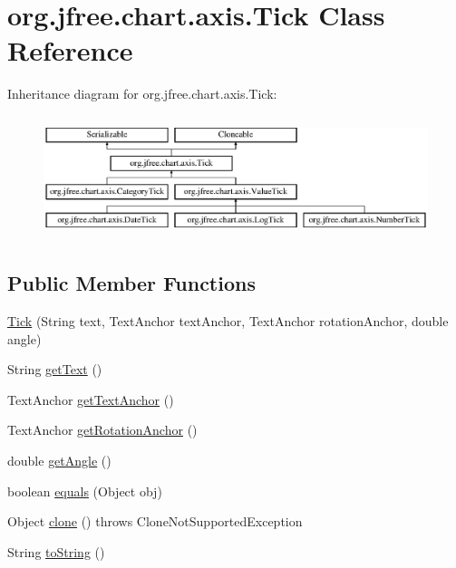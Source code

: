 \hypertarget{classorg_1_1jfree_1_1chart_1_1axis_1_1_tick}{}\section{org.\+jfree.\+chart.\+axis.\+Tick Class Reference}
\label{classorg_1_1jfree_1_1chart_1_1axis_1_1_tick}
Inheritance diagram for org.\+jfree.\+chart.\+axis.\+Tick\+:\begin{figure}[H]
\begin{center}
\leavevmode
\includegraphics[height=3.607085cm]{classorg_1_1jfree_1_1chart_1_1axis_1_1_tick}
\end{center}
\end{figure}
\subsection*{Public Member Functions}
\begin{DoxyCompactItemize}
\item 
\mbox{\hyperlink{classorg_1_1jfree_1_1chart_1_1axis_1_1_tick_a976d3d49d3c66a97827423d08d68101b}{Tick}} (String text, Text\+Anchor text\+Anchor, Text\+Anchor rotation\+Anchor, double angle)
\item 
String \mbox{\hyperlink{classorg_1_1jfree_1_1chart_1_1axis_1_1_tick_a6c9cf3d1de674f831874b762d53e6d79}{get\+Text}} ()
\item 
Text\+Anchor \mbox{\hyperlink{classorg_1_1jfree_1_1chart_1_1axis_1_1_tick_a2e7f5b8a1f91555793982ee870d89c84}{get\+Text\+Anchor}} ()
\item 
Text\+Anchor \mbox{\hyperlink{classorg_1_1jfree_1_1chart_1_1axis_1_1_tick_a8e5184bcfb4de2942eafa801c1b385ef}{get\+Rotation\+Anchor}} ()
\item 
double \mbox{\hyperlink{classorg_1_1jfree_1_1chart_1_1axis_1_1_tick_aeae836adb630dc541a073be7ca934eec}{get\+Angle}} ()
\item 
boolean \mbox{\hyperlink{classorg_1_1jfree_1_1chart_1_1axis_1_1_tick_a9cac78e6fd43f85c0ce9f012579ed8b3}{equals}} (Object obj)
\item 
Object \mbox{\hyperlink{classorg_1_1jfree_1_1chart_1_1axis_1_1_tick_ae57138a3985454e4e7152cff31a603cc}{clone}} ()  throws Clone\+Not\+Supported\+Exception 
\item 
String \mbox{\hyperlink{classorg_1_1jfree_1_1chart_1_1axis_1_1_tick_a2c02890c3d1ff243df8a6f199dbde8a6}{to\+String}} ()
\end{DoxyCompactItemize}


